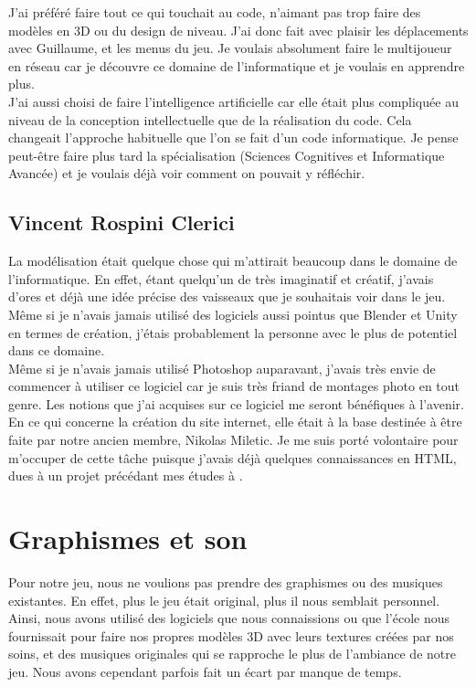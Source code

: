 \documentclass[12pt, titlepage]{article}
\begin{document}
\begin{spacing}{1.5}
J'ai préféré faire tout ce qui touchait au code, n'aimant pas trop faire des modèles en 3D ou du design de niveau. J'ai donc fait avec plaisir les déplacements avec Guillaume, et les menus du jeu. Je voulais absolument faire le multijoueur en réseau car je découvre ce domaine de l'informatique et je voulais en apprendre plus.\\

J'ai aussi choisi de faire l'intelligence artificielle car elle était plus compliquée au niveau de la conception intellectuelle que de la réalisation du code. Cela changeait l'approche habituelle que l'on se fait d'un code informatique. Je pense peut-être faire plus tard la spécialisation  (Sciences Cognitives et Informatique Avancée) et je voulais déjà voir comment on pouvait y réfléchir.\\

\subsection{Vincent Rospini Clerici}

La modélisation était quelque chose qui m’attirait beaucoup dans le domaine de l’informatique. En effet, étant quelqu’un de très imaginatif et créatif, j’avais d’ores et déjà une idée précise des vaisseaux que je souhaitais voir dans le jeu. Même si je n’avais jamais utilisé des logiciels aussi pointus que Blender et Unity en termes de création, j’étais probablement la personne avec le plus de potentiel dans ce domaine.\\

Même si je n’avais jamais utilisé Photoshop auparavant, j’avais très envie de commencer à utiliser ce logiciel car je suis très friand de montages photo en tout genre. Les notions que j’ai acquises sur ce logiciel me seront bénéfiques à l’avenir.\\

En ce qui concerne la création du site internet, elle était à la base destinée à être faite par notre ancien membre, Nikolas Miletic. Je me suis porté volontaire pour m’occuper de cette tâche puisque j’avais déjà quelques connaissances en HTML, dues à un projet précédant mes études à .\\


\newpage
\section{Graphismes et son}

Pour notre jeu, nous ne voulions pas prendre des graphismes ou des musiques existantes. En effet, plus le jeu était original, plus il nous semblait personnel. Ainsi, nous avons utilisé des logiciels que nous connaissions ou que l'école nous fournissait pour faire nos propres modèles 3D avec leurs textures créées par nos soins, et des musiques originales qui se rapproche le plus de l'ambiance de notre jeu. Nous avons cependant parfois fait un écart par manque de temps.\\


\end{spacing}
\end{document}
